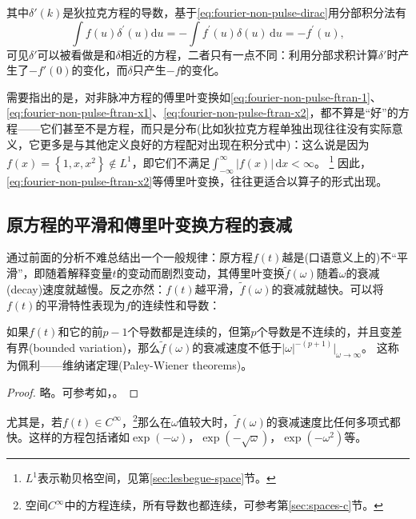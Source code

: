 其中$\delta'(k)$是狄拉克方程的导数，基于\eqref{eq:fourier-non-pulse-dirac}用分部积分法有
\begin{equation*}
  \int f(u) \delta^{'}(u) \mathrm{d} u =
  - \int f^{'}(u) \delta(u) \, \mathrm{d} u = - f^{'}(u),
\end{equation*}
可见$\delta'$可以被看做是和$\delta$相近的方程，二者只有一点不同：利用分部求积计算$\delta'$时产生了$- f'(0)$的变化，而$\delta$只产生$-f$的变化。

需要指出的是，对非脉冲方程的傅里叶变换如\eqref{eq:fourier-non-pulse-ftran-1}、\eqref{eq:fourier-non-pulse-ftran-x1}、\eqref{eq:fourier-non-pulse-ftran-x2}，都不算是``好''的方程——它们甚至不是方程，而只是分布(比如狄拉克方程单独出现往往没有实际意义，它更多是与其他定义良好的方程配对出现在积分式中)：这么说是因为$f(x)= \left\{ 1, x, x^{2} \right\} \notin L^{1}$，即它们不满足$\int_{-\infty}^{\infty} \left| f(x) \right| \, \mathrm{d}x < \infty$。
\footnote{$L^{1}$表示勒贝格空间，见第\eqref{sec:lesbegue-space}节。}
因此，\eqref{eq:fourier-non-pulse-ftran-x2}等傅里叶变换，往往更适合以算子的形式出现。

\subsection{原方程的平滑和傅里叶变换方程的衰减}
\label{sec:fourier-smoothness-decay}
通过前面的分析不难总结出一个一般规律：原方程$f(t)$越是(口语意义上的)不``平滑''，即随着解释变量$t$的变动而剧烈变动，其傅里叶变换$\tilde{f} \left( \omega \right)$随着$\omega$的衰减(decay)速度就越慢。反之亦然：$f(t)$越平滑，$\tilde{f} \left( \omega \right)$的衰减就越快。可以将$f(t)$的平滑特性表现为$f$的连续性和导数：
\begin{theorem}[佩利——维纳诸定理]
  \label{theorem:paley-wiener-theorems}
  如果$f(t)$和它的前$p-1$个导数都是连续的，但第$p$个导数是不连续的，并且变差有界(bounded variation)，那么$\tilde{f}(\omega)$的衰减速度不低于$\left| \omega \right|^{- \left( p + 1 \right)} \big|_{\omega \rightarrow \infty}$。  这称为佩利——维纳诸定理(Paley-Wiener theorems)。
\end{theorem}
\begin{proof}
  略。可参考如\cite[Sec. VI.4]{Yosida:1978ul}，\cite[Theorem 4.1.2]{Agranovich:2015cv}。
\end{proof}

  尤其是，若$f(t) \in C^{\infty}$，\footnote{空间$C^{\infty}$中的方程连续，所有导数也都连续，可参考第\ref{sec:spaces-c}节。}那么在$\omega$值较大时，$\tilde{f}(\omega)$的衰减速度比任何多项式都快。这样的方程包括诸如$\exp \left( - \omega \right)$，$\exp \left( - \sqrt{\omega} \right)$，$\exp \left( - \omega^{2} \right)$等。

